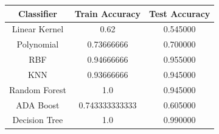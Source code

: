 \documentclass{article}
\begin{document}
\begin{table}[htb]
\begin{tabular}{|c|c|c|}
\hline
\textbf{Classifier} & \textbf{Train Accuracy} & \textbf{Test Accuracy} \\ \hline
Linear Kernel       & 0.62                    & 0.545000               \\ \hline
Polynomial          & 0.73666666              & 0.700000               \\ \hline
RBF                 & 0.94666666              & 0.955000               \\ \hline
KNN                 & 0.93666666              & 0.945000               \\ \hline
Random Forest       & 1.0                     & 0.945000               \\ \hline
ADA Boost           & 0.743333333333          & 0.605000               \\ \hline
Decision Tree       & 1.0                     & 0.990000               \\ \hline
\end{tabular}
\end{table}
\end{document}
